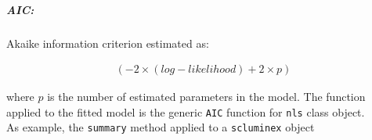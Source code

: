\documentclass[11pt]{article}\usepackage[]{graphicx}\usepackage[]{color}
\begin{document}
\subparagraph{AIC:} Akaike information criterion estimated as:

\begin{align*}
\left(  -2 \times (log-likelihood) + 2 \times p \right)
\end{align*}

\noindent where $p$ is the number of estimated parameters in the model. The 
function applied to the fitted model is the generic {\tt AIC} function for 
{\tt nls} class object. \\


\noindent As example, the {\tt summary} method applied to a {\tt scluminex}
object
\end{document}
